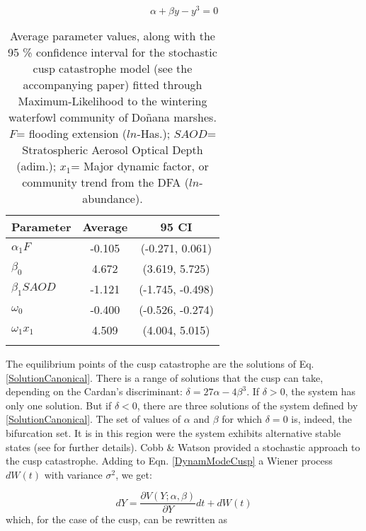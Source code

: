 \documentclass[11pt]{article}
\begin{document}
\begin{equation}\label{SolutionCanonical}
	\alpha + \beta y - y^3 = 0
\end{equation}

\begin{table}
	\centering
	\caption[Average parameter values for the cusp catastrophe model]{Average parameter values, along with the 95 \% confidence interval for the stochastic cusp catastrophe model (see the accompanying paper) fitted through Maximum-Likelihood to the wintering waterfowl community of Doñana marshes. $F$= flooding extension ($ln$-Has.); $SAOD$= Stratospheric Aerosol Optical Depth (adim.); $x_{1}$= Major dynamic factor, or community trend from the DFA ($ln$-abundance).}
	\label{tab:TableCusp}
	\begin{tabular}{lcc}%
		\toprule
		\textbf{Parameter} & \textbf{Average} & \textbf{95 CI} \\
		\midrule
		$ \alpha_{1}F $ & -0.105 & (-0.271, 0.061) \\
		$ \beta_{0} $ & 4.672 & (3.619, 5.725) \\
		$ \beta_{1}SAOD $ & -1.121 & (-1.745, -0.498) \\
		$ \omega_{0} $ & -0.400 & (-0.526, -0.274) \\
		$ \omega_{1}x_{1} $ & 4.509 & (4.004, 5.015) \\
		\bottomrule
		&& \\
	\end{tabular}
\end{table}

The equilibrium points of the cusp catastrophe are the solutions of Eq. \ref{SolutionCanonical}. There is a range of solutions that the cusp can take, depending on the Cardan's discriminant: $ \delta = 27\alpha - 4\beta^3 $. If $ \delta > 0 $, the system has only one solution. But if $ \delta < 0 $, there are three solutions of the system defined by \ref{SolutionCanonical}. The set of values of $ \alpha $ and $ \beta $ for which $ \delta = 0 $ is, indeed, the bifurcation set. It is in this region were the system exhibits alternative stable states (see \cite{Thom1975,Casti1979,Grasman2009} for further details). Cobb \& Watson \cite{Cobb1980} provided a stochastic approach to the cusp catastrophe. Adding to Eqn. \ref{DynamModeCusp} a Wiener process $ dW(t) $ with variance $ \sigma^2 $, we get:

\begin{equation}\label{StochCuspModel_1}
	dY = \dfrac{\partial V(Y; \alpha,\beta)}{\partial Y}dt + dW(t)
\end{equation}
which, for the case of the cusp, can be rewritten as
\end{document}
